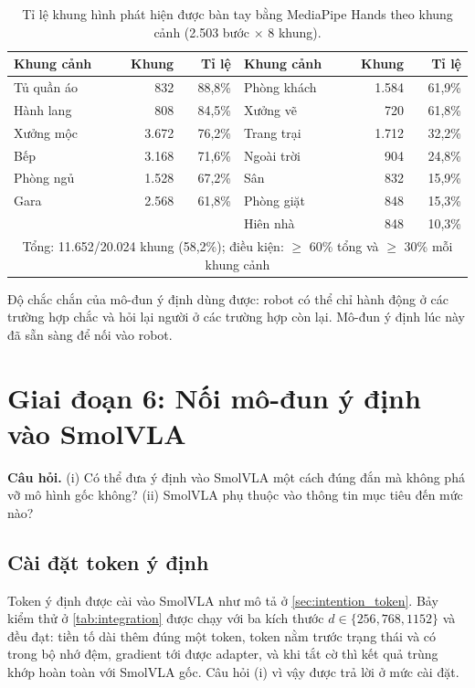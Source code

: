 \documentclass[a4paper,oneside]{report}
\begin{document}
\begin{table}[ht]
\centering
\caption{Tỉ lệ khung hình phát hiện được bàn tay bằng MediaPipe Hands theo khung cảnh (2.503 bước $\times$ 8 khung).}
\label{tab:hoi}
\small
\begin{tabular}{lrr@{\hspace{1.2cm}}lrr}
\toprule
Khung cảnh & Khung & Tỉ lệ & Khung cảnh & Khung & Tỉ lệ \\
\midrule
Tủ quần áo & 832 & 88,8\% & Phòng khách & 1.584 & 61,9\% \\
Hành lang & 808 & 84,5\% & Xưởng vẽ & 720 & 61,8\% \\
Xưởng mộc & 3.672 & 76,2\% & Trang trại & 1.712 & 32,2\% \\
Bếp & 3.168 & 71,6\% & Ngoài trời & 904 & 24,8\% \\
Phòng ngủ & 1.528 & 67,2\% & Sân & 832 & 15,9\% \\
Gara & 2.568 & 61,8\% & Phòng giặt & 848 & 15,3\% \\
 & & & Hiên nhà & 848 & 10,3\% \\
\midrule
\multicolumn{6}{c}{Tổng: 11.652/20.024 khung (58,2\%); điều kiện: $\geq$ 60\% tổng và $\geq$ 30\% mỗi khung cảnh} \\
\bottomrule
\end{tabular}
\end{table}

\begin{ketqua}
Độ chắc chắn của mô-đun ý định dùng được: robot có thể chỉ hành động ở các trường hợp chắc và hỏi lại người ở các trường hợp còn lại. Mô-đun ý định lúc này đã sẵn sàng để nối vào robot.
\end{ketqua}

\section{Giai đoạn 6: Nối mô-đun ý định vào SmolVLA}
\label{sec:stage6}

\textbf{Câu hỏi.} (i) Có thể đưa ý định vào SmolVLA một cách đúng đắn mà không phá vỡ mô hình gốc không? (ii) SmolVLA phụ thuộc vào thông tin mục tiêu đến mức nào?

\subsection{Cài đặt token ý định}
\label{sec:adapter}

Token ý định được cài vào SmolVLA như mô tả ở \cref{sec:intention_token}. Bảy kiểm thử ở \cref{tab:integration} được chạy với ba kích thước $d\in\{256,768,1152\}$ và đều đạt: tiền tố dài thêm đúng một token, token nằm trước trạng thái và có trong bộ nhớ đệm, gradient tới được adapter, và khi tắt cờ thì kết quả trùng khớp hoàn toàn với SmolVLA gốc. Câu hỏi (i) vì vậy được trả lời ở mức cài đặt.
\end{document}
